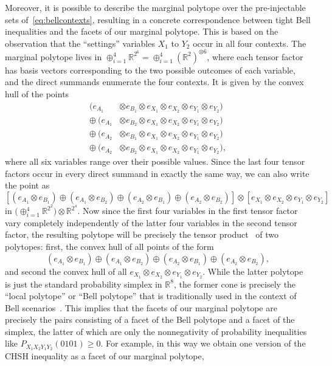 \documentclass[aps,english,superscriptaddress,onecolumn,twoside,longbibliography,pra,floatfix,fleqn,nofootinbib]{revtex4-1}%
\theoremstyle{definition}
\newcounter{example}[section]
\begin{document}
Moreover, it is possible to describe the marginal polytope over the pre-injectable sets of~\cref{eq:bellcontexts}, resulting in a concrete correspondence between tight Bell inequalities and the facets of our marginal polytope. This is based on the observation that the ``settings'' variables $X_1$ to $Y_2$ occur in all four contexts. The marginal polytope lives in $\oplus_{i=1}^4 \mathbb{R}^{2^6} = \oplus_{i=1}^4 (\mathbb{R}^2)^{\otimes 6}$, where each tensor factor has basis vectors corresponding to the two possible outcomes of each variable, and the direct summands enumerate the four contexts. It is given by the convex hull of the points
\begin{align*}
	(e_{A_1} & \otimes e_{B_1} \otimes e_{X_1} \otimes e_{X_2} \otimes e_{Y_1} \otimes e_{Y_2}) \\
	\oplus\: (e_{A_1} & \otimes e_{B_2} \otimes e_{X_1} \otimes e_{X_2} \otimes e_{Y_1} \otimes e_{Y_2}) \\
	\oplus\: (e_{A_2} & \otimes e_{B_1} \otimes e_{X_1} \otimes e_{X_2} \otimes e_{Y_1} \otimes e_{Y_2}) \\
	\oplus\: (e_{A_2} & \otimes e_{B_2} \otimes e_{X_1} \otimes e_{X_2} \otimes e_{Y_1} \otimes e_{Y_2}),
\end{align*}
where all six variables range over their possible values. Since the last four tensor factors occur in every direct summand in exactly the same way, we can also write the point as
\[
	\left[ (e_{A_1} \otimes e_{B_1}) \oplus (e_{A_1} \otimes e_{B_2}) \oplus (e_{A_2} \otimes e_{B_1}) \oplus (e_{A_2} \otimes e_{B_2})\right] \otimes \left[ e_{X_1} \otimes e_{X_2} \otimes e_{Y_1} \otimes e_{Y_2}\right]
\]
in $\big(\oplus_{i=1}^4 \mathbb{R}^{2^2}\big)\otimes \mathbb{R}^{2^4}$. Now since the first four variables in the first tensor factor vary completely independently of the latter four variables in the second tensor factor, the resulting polytope will be precisely the tensor product~\cite{namioka_tensor_1969,bogart_hom_2013} of two polytopes: first, the convex hull of all points of the form
\[
	(e_{A_1} \otimes e_{B_1}) \oplus (e_{A_1} \otimes e_{B_2}) \oplus (e_{A_2} \otimes e_{B_1}) \oplus (e_{A_2} \otimes e_{B_2}),
\]
and second the convex hull of all $e_{X_1} \otimes e_{X_2} \otimes e_{Y_1} \otimes e_{Y_2}$. While the latter polytope is just the standard probability simplex in $\mathbb{R}^8$, the former cone is precisely the ``local polytope'' or ``Bell polytope'' that is traditionally used in the context of Bell scenarios~\cite[Sec.~II.B]{Brunner2013Bell}. This implies that the facets of our marginal polytope are precisely the pairs consisting of a facet of the Bell polytope and a facet of the simplex, the latter of which are only the nonnegativity of probability inequalities like $P_{X_1X_2Y_1Y_2}(0101)\geq 0$. For example, in this way we obtain one version of the CHSH inequality as a facet of our marginal polytope,
\end{document}
